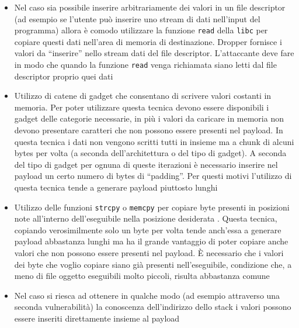 \begin{itemize}

\item Nel caso sia possibile inserire arbitrariamente dei valori in un
  file descriptor (ad esempio se l'utente può inserire uno stream di
  dati nell'input del programma) allora è comodo utilizzare la
  funzione \lstinline{read} della \lstinline{libc} per copiare questi
  dati nell'area di memoria di destinazione. Dropper fornisce i valori
  da ``inserire'' nello stream dati del file descriptor. L'attaccante
  deve fare in modo che quando la funzione \lstinline{read} venga
  richiamata siano letti dal file descriptor proprio quei dati

\item Utilizzo di catene di gadget che consentano di scrivere valori
  costanti in memoria. Per poter utilizzare questa tecnica devono
  essere disponibili i gadget delle categorie necessarie, in più i
  valori da caricare in memoria non devono presentare caratteri che
  non possono essere presenti nel payload. In questa tecnica i dati
  non vengono scritti tutti in insieme ma a chunk di alcuni bytes per
  volta (a seconda dell'architettura o del tipo di gadget). A seconda
  del tipo di gadget per ognuna di queste iterazioni è necessario
  inserire nel payload un certo numero di bytes di ``padding''. Per
  questi motivi l'utilizzo di questa tecnica tende a generare payload
  piuttosto lunghi

\item Utilizzo delle funzioni \lstinline{strcpy} o \lstinline{memcpy}
  per copiare byte presenti in posizioni note all'interno
  dell'eseguibile nella posizione desiderata \cite{longld:2010}.
  Questa tecnica, copiando verosimilmente solo un byte per volta tende
  anch'essa a generare payload abbastanza lunghi ma ha il grande
  vantaggio di poter copiare anche valori che non possono essere
  presenti nel payload. È necessario che i valori dei byte che voglio
  copiare siano già presenti nell'eseguibile, condizione che, a meno
  di file oggetto eseguibili molto piccoli, risulta abbastanza comune

\item Nel caso si riesca ad ottenere in qualche modo (ad esempio
  attraverso una seconda vulnerabilità) la conoscenza dell'indirizzo
  dello stack i valori possono essere inseriti direttamente insieme al
  payload

\end{itemize}

